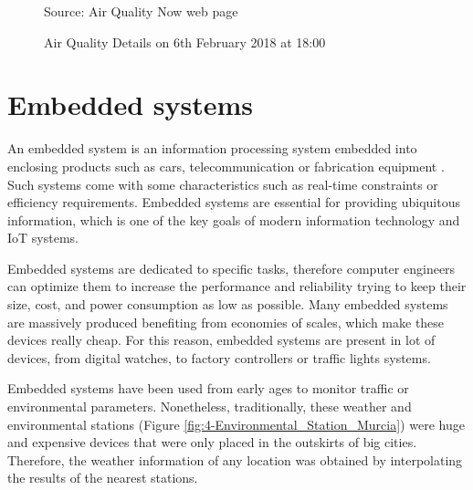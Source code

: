 \begin{figure}[!htbp]
	\centering
	\caption{Air Quality Details on 6th February 2018 at 18:00}
	\label{fig:4-AirQuality-Details}{Source: Air Quality Now web page \cite{airqualitynow}}
\end{figure}


\newpage
\section{Embedded systems}
An embedded system is an information processing system embedded into enclosing products such as cars, telecommunication or fabrication equipment \cite{Mar16}. Such systems come with some characteristics such as real-time constraints or efficiency requirements. Embedded systems are essential for providing ubiquitous information, which is one of the key goals of modern information technology and \ac{IoT} systems.

Embedded systems are dedicated to specific tasks, therefore computer engineers can optimize them to increase the performance and reliability trying to keep their size, cost, and power consumption as low as possible. Many embedded systems are massively produced benefiting from economies of scales, which make these devices really cheap. For this reason, embedded systems are present in lot of devices, from digital watches, to factory controllers or traffic lights systems. 

Embedded systems have been used from early ages to monitor traffic or environmental parameters. Nonetheless, traditionally, these weather and environmental stations (Figure \ref{fig:4-Environmental_Station_Murcia}) were huge and expensive devices that were only placed in the outskirts of big cities. Therefore, the weather information of any location was obtained by interpolating the results of the nearest stations.

